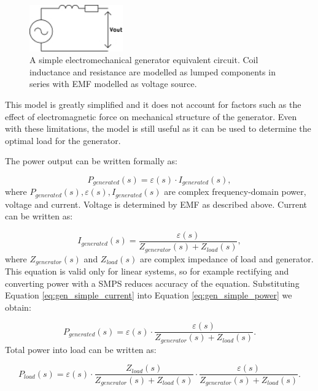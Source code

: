 \begin{figure}[htb]
\begin{center}
\includegraphics[height=2cm]{images/own_dwg/gen_simple}
\end{center}
\caption{A simple electromechanical generator equivalent circuit. Coil inductance and resistance are modelled as lumped components in series with EMF modelled as voltage source.}
\label{gen_simple}
\end{figure}

This model is greatly simplified and it does not account for factors such as the effect of electromagnetic force on mechanical structure of the generator. Even with these limitations, the model is still useful as it can be used to determine the optimal load for the generator. 

The power output can be written formally as:

\begin{equation} \label{eq:gen_simple_power}
  P_{generated}(s) = \varepsilon(s) \cdot I_{generated}(s),
\end{equation}
where $P_{generated}(s), \varepsilon(s), I_{generated}(s)$ are complex frequency-domain power, voltage and current. Voltage is determined by EMF as described above. Current can be written as: 

\begin{equation} \label{eq:gen_simple_current}
  I_{generated}(s) = \frac{\varepsilon(s)}{Z_{generator}(s)+Z_{load}(s)},
\end{equation}
where $Z_{generator}(s) $ and $ Z_{load}(s)$ are complex impedance of load and generator. This equation is valid only for linear systems, so for example rectifying and converting power with a SMPS reduces accuracy of the equation. Substituting Equation \eqref{eq:gen_simple_current} into Equation \eqref{eq:gen_simple_power} we obtain:

\begin{equation}
  P_{generated}(s) = \varepsilon(s) \cdot \frac{\varepsilon(s)}{Z_{generator}(s)+Z_{load}(s)}.
\end{equation}
Total power into load can be written as:

\begin{equation} \label{eq:generator_load_power}
  P_{load}(s) = \varepsilon(s)  \cdot  \frac{Z_{load}(s)}{Z_{generator}(s)+Z_{load}(s)}  \cdot  \frac{\varepsilon(s)}{Z_{generator}(s)+Z_{load}(s)}.
\end{equation}

